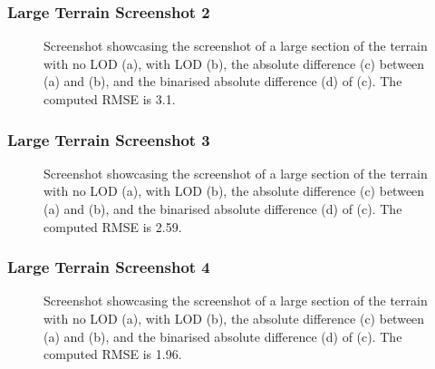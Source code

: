 \subsubsection{Large Terrain Screenshot 2}
\begin{figure}[H]
  \centering
  \qquad
  \qquad
  \qquad
  \caption{Screenshot showcasing the screenshot of a large section of the terrain with no LOD (a), with LOD (b),
   the absolute difference (c) between (a) and (b), and the binarised absolute difference (d) of (c). The computed RMSE is 3.1.}\label{fig:results-large-2}
\end{figure}
\subsubsection{Large Terrain Screenshot 3}
\begin{figure}[H]
  \centering
  \qquad
  \qquad
  \qquad
  \caption{Screenshot showcasing the screenshot of a large section of the terrain with no LOD (a), with LOD (b),
   the absolute difference (c) between (a) and (b), and the binarised absolute difference (d) of (c). The computed RMSE is 2.59.}\label{fig:results-large-3}
\end{figure}
\subsubsection{Large Terrain Screenshot 4}
\begin{figure}[H]
  \centering
  \qquad
  \qquad
  \qquad
  \caption{Screenshot showcasing the screenshot of a large section of the terrain with no LOD (a), with LOD (b),
   the absolute difference (c) between (a) and (b), and the binarised absolute difference (d) of (c). The computed RMSE is 1.96.}\label{fig:results-large-4}
\end{figure}
